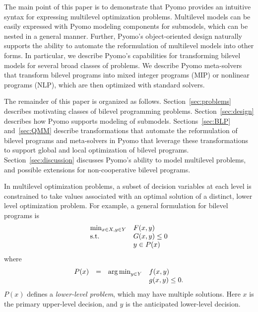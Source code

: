 The main point of this paper is to demonstrate that Pyomo provides
an intuitive syntax for expressing multilevel optimization problems.
Multilevel models can be easily expressed with Pyomo modeling
components for submodels, which can be nested in a general manner.
Further, Pyomo's object-oriented design naturally supports the
ability to automate the reformulation of multilevel models into
other forms.  In particular, we describe Pyomo's capabilities for
transforming bilevel models for several broad classes of problems.
We describe Pyomo meta-solvers that transform bilevel programs into
mixed integer programs (MIP) or nonlinear programs (NLP), which are
then optimized with standard solvers.

The remainder of this paper is organized as follows.
Section~\ref{sec:problems} describes motivating classes of bilevel
programming problems.  Section~\ref{sec:design} describes how Pyomo
supports modeling of submodels.  Sections~\ref{sec:BLP} and~\ref{sec:QMM}
describe transformations that automate the reformulation of bilevel
programs and meta-solvers in Pyomo that leverage these transformations
to support global and local optimization of bilevel programs.
Section~\ref{sec:discussion} discusses Pyomo's ability to model multilevel problems, and possible extensions for non-cooperative bilevel programs.

\fi


\label{sec:modeling}

In multilevel optimization problems, a subset of decision variables
at each level is constrained to take values associated with an
optimal solution of a distinct, lower level optimization problem.
For example, a general formulation for bilevel programs is
\begin{equation}
\label{eqn:bilevel}
\begin{array}{ll}
\min_{x \in X, y \in Y}   & F(x,y)\\
\textrm{s.t.}                 & G(x,y) \leq 0\\
                    & y \in P(x)
\end{array}
\end{equation}
where
\[
\begin{array}{llll}
P(x) & = & \operatorname*{arg\,min}_{y \in Y}    & f(x,y)\\
 & &                            & g(x,y) \leq 0.
\end{array}
\]
$P(x)$ defines a \textit{lower-level problem}, which may have multiple solutions.
Here $x$ is the primary upper-level decision, and $y$ is the anticipated lower-level 
decision.

